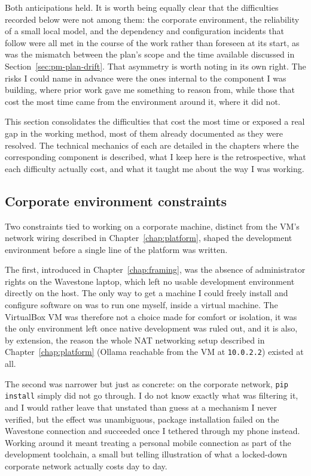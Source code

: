 Both anticipations held. It is worth being equally clear that the difficulties recorded below were not among them: the corporate environment, the reliability of a small local model, and the dependency and configuration incidents that follow were all met in the course of the work rather than foreseen at its start, as was the mismatch between the plan's scope and the time available discussed in Section~\ref{sec:pm-plan-drift}. That asymmetry is worth noting in its own right. The risks I could name in advance were the ones internal to the component I was building, where prior work gave me something to reason from, while those that cost the most time came from the environment around it, where it did not.

This section consolidates the difficulties that cost the most time or exposed a real gap in the working method, most of them already documented as they were resolved. The technical mechanics of each are detailed in the chapters where the corresponding component is described, what I keep here is the retrospective, what each difficulty actually cost, and what it taught me about the way I was working.

\subsection{Corporate environment constraints}
\label{sec:pm-corporate-constraints}

Two constraints tied to working on a corporate machine, distinct from the VM's network wiring described in Chapter~\ref{chap:platform}, shaped the development environment before a single line of the platform was written.

The first, introduced in Chapter~\ref{chap:framing}, was the absence of administrator rights on the Wavestone laptop, which left no usable development environment directly on the host. The only way to get a machine I could freely install and configure software on was to run one myself, inside a virtual machine. The VirtualBox VM was therefore not a choice made for comfort or isolation, it was the only environment left once native development was ruled out, and it is also, by extension, the reason the whole NAT networking setup described in Chapter~\ref{chap:platform} (Ollama reachable from the VM at \texttt{10.0.2.2}) existed at all.

The second was narrower but just as concrete: on the corporate network, \texttt{pip install} simply did not go through. I do not know exactly what was filtering it, and I would rather leave that unstated than guess at a mechanism I never verified, but the effect was unambiguous, package installation failed on the Wavestone connection and succeeded once I tethered through my phone instead. Working around it meant treating a personal mobile connection as part of the development toolchain, a small but telling illustration of what a locked-down corporate network actually costs day to day.

